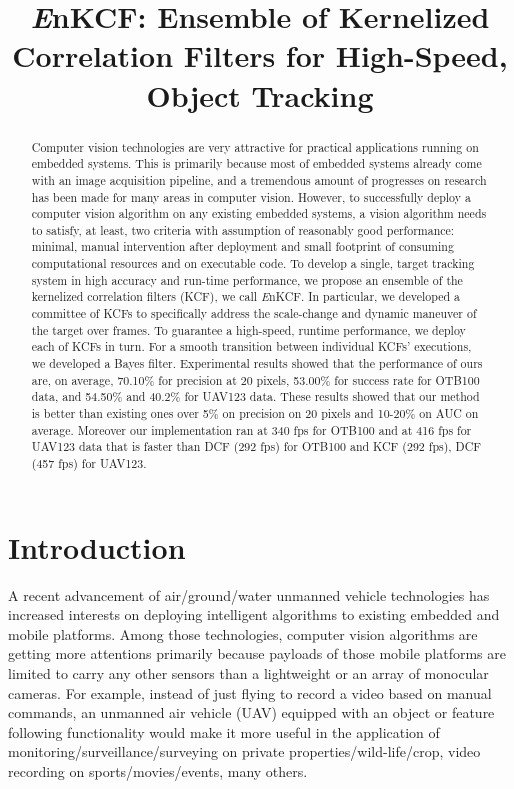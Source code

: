 \documentclass{bmvc2k}
\title{ {\it E}nKCF: Ensemble of Kernelized Correlation Filters for
  High-Speed, Object Tracking}
\begin{document}
\maketitle

\begin{abstract}
Computer vision technologies are very attractive for practical
applications running on embedded systems. This is primarily because
most of embedded systems already come with an image acquisition
pipeline, and a tremendous amount of progresses on research has been
made for many areas in computer vision. However, to successfully
deploy a computer vision algorithm on any existing embedded systems, a
vision algorithm needs to satisfy, at least, two criteria with
assumption of reasonably good performance: minimal, manual
intervention after deployment and small footprint of consuming
computational resources and on executable code. To develop a single,
target tracking system in high accuracy and run-time performance, we
propose an ensemble of the kernelized correlation filters (KCF), we
call {\it E}nKCF. In particular, we developed a committee of KCFs to
specifically address the scale-change and dynamic maneuver of the
target over frames. To guarantee a high-speed, runtime performance, we
deploy each of KCFs in turn. For a smooth transition between
individual KCFs' executions, we developed a Bayes filter. Experimental
results showed that the performance of ours are, on average, 70.10\%
for precision at 20 pixels, 53.00\% for success rate for OTB100 data,
and 54.50\% and 40.2\% for UAV123 data. These results showed that our
method is better than existing ones over 5\% on precision on 20 pixels
and 10-20\% on AUC on average. Moreover our implementation ran at 340
fps for OTB100 and at 416 fps for UAV123 data that is faster than DCF
(292 fps) for OTB100 and KCF (292 fps), DCF (457 fps) for UAV123.
\end{abstract}

\section{Introduction}
A recent advancement of air/ground/water unmanned vehicle technologies
has increased interests on deploying intelligent algorithms to
existing embedded and mobile platforms. Among those technologies,
computer vision algorithms are getting more attentions primarily
because payloads of those mobile platforms are limited to carry any
other sensors than a lightweight or an array of monocular cameras. For
example, instead of just flying to record a video based on manual
commands, an unmanned air vehicle (UAV) equipped with an object or
feature following functionality would make it more useful in the
application of monitoring/surveillance/surveying on private
properties/wild-life/crop, video recording on sports/movies/events,
many others.
\end{document}
